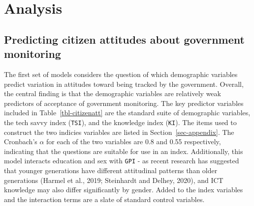 \documentclass[
  letterpaper,
  DIV=11,
  numbers=noendperiod]{scrartcl}
\begin{document}
\section{Analysis}\label{sec-analysis}

\subsection{Predicting citizen attitudes about government
monitoring}\label{predicting-citizen-attitudes-about-government-monitoring}

The first set of models considers the question of which demographic
variables predict variation in attitudes toward being tracked by the
government. Overall, the central finding is that the demographic
variables are relatively weak predictors of acceptance of government
monitoring. The key predictor variables included in
Table~\ref{tbl-citizenatt} are the standard suite of demographic
variables, the tech savvy index (\texttt{TSI}), and the knowledge index
(\texttt{KI}). The items used to construct the two indicies variables
are listed in Section~\ref{sec-appendix}. The Cronbach's \(\alpha\) for
each of the two variables are 0.8 and 0.55 respectively, indicating that
the questions are suitable for use in an index. Additionally, this model
interacts education and sex with \texttt{GPI} - as recent research has
suggested that younger generations have different attitudinal patterns
than older generations (Harmel et al., 2019; Steinhardt and Delhey,
2020), and ICT knowledge may also differ significantly by gender. Added
to the index variables and the interaction terms are a slate of standard
control variables.
\end{document}

